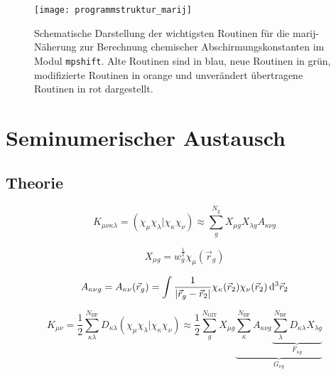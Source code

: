 \begin{figure}[ht!]
\centering
\texttt{[image: programmstruktur\_marij]}
\captionsetup{figurewithin = chapter}
\captionsetup{font=small, labelfont=bf}\caption[\ac{marij} Routinen für chemische Abschirmungskonstanten]{Schematische Darstellung der wichtigsten Routinen für die \ac{marij}-Näherung zur Berechnung chemischer Abschirmungskonstanten im Modul \texttt{mpshift}. Alte Routinen sind in blau, neue Routinen in grün, modifizierte Routinen in orange und unverändert übertragene Routinen in rot dargestellt.}
\label{abb:programmstrukur_marij}
\end{figure}


\section{Seminumerischer Austausch}
\supercite{plessow2012seminumerical}
	\subsection{Theorie}
	\begin{equation}
	K_{\mu\nu\kappa\lambda}=\left(\chi_\mu\chi_\lambda\vert\chi_\kappa\chi_\nu\right)\approx \sum_{g}^{N_{\textrm{g}}} X_{\mu g}X_{\lambda g}A_{\kappa\nu g}
	\end{equation}		
	
	\begin{equation}
	X_{\mu g}=w_g^{\frac{1}{2}}\chi_\mu(\vec{r}_g)
	\end{equation}
	
	\begin{equation}
	A_{\kappa\nu g}=A_{\kappa\nu}(\vec{r}_g)=\int \frac{1}{\vert\vec{r}_g-\vec{r}_2\vert}\chi_\kappa(\vec{r}_2)\chi_\nu(\vec{r}_2)\mathop{}\!\mathrm{d^3}\vec{r}_2
	\end{equation}
	
	\begin{equation}
	K_{\mu\nu}=\frac{1}{2}\sum_{\kappa\lambda}^{N_{\textrm{BF}}}D_{\kappa\lambda} \left(\chi_\mu\chi_\lambda\vert\chi_\kappa\chi_\nu\right)
	\approx\frac{1}{2}\sum_{g}^{N_{\textrm{GIT}}}X_{\mu g}\underbrace{\sum_\kappa^{N_{\textrm{BF}}}A_{\kappa\nu g}\underbrace{\sum_\lambda^{N_{\textrm{BF}}}D_{\kappa\lambda}X_{\lambda g}}_{F_{\kappa g}}}_{G_{\nu g}}
	\end{equation}
	
